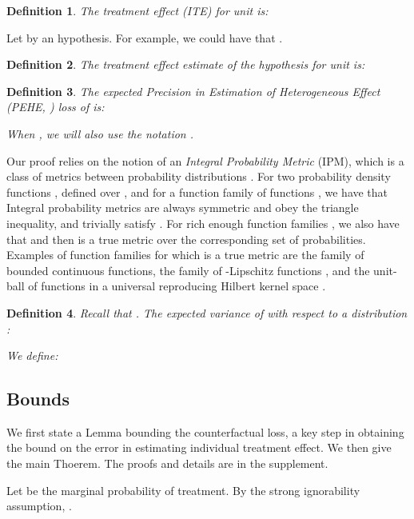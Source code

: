 \documentclass{article}
\newtheorem{thmdef}{Definition}
\begin{document}
\begin{thmdef}\label{def:te}
The treatment effect (ITE) for unit  is:

\end{thmdef}


Let  by an hypothesis. For example, we could have that .
\begin{thmdef}\label{def:inditeerr}
The treatment effect estimate of the hypothesis  for unit  is:

\end{thmdef}


\begin{thmdef}
The expected Precision in Estimation of Heterogeneous Effect (PEHE,  \citet{hill2011bayesian}) loss of  is:

When , we will also use the notation .
\end{thmdef}

Our proof relies on the notion of an \emph{Integral Probability Metric} (IPM), which is a class of metrics between probability distributions \citep{sriperumbudur2012empirical,muller1997integral}.
For two probability density functions ,  defined over , and for a function family  of functions , we have that 
Integral probability metrics are always symmetric and obey the triangle inequality, and trivially satisfy . For rich enough function families , we also have that  and then  is a true metric over the corresponding set of probabilities. Examples of function families  for which  is a true metric are the family of bounded continuous functions, the family of -Lipschitz functions \citep{sriperumbudur2012empirical}, and the unit-ball of functions in a universal reproducing Hilbert kernel space \citep{gretton2012mmd}.



\begin{thmdef}
Recall that .
The expected variance of  with respect to a distribution :

We define:

\end{thmdef}
\subsection{Bounds}

We first state a Lemma bounding the counterfactual loss, a key step in obtaining the bound on the error in estimating individual treatment effect. We then give the main Thoerem. The proofs and details are in the supplement.

Let  be the marginal probability of treatment. By the strong ignorability assumption, .
\end{document}
